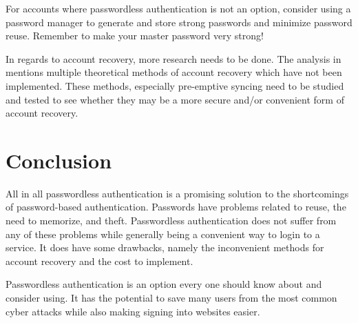\documentclass[12pt, letterpaper]{article}
\begin{document}
For accounts where passwordless authentication is not an option, consider using a password manager to generate and store strong passwords and minimize password reuse.
Remember to make your master password very strong!

In regards to account recovery, more research needs to be done.
The analysis in \parencite{kunke2021evaluation} mentions multiple theoretical methods of account recovery which have not been implemented.
These methods, especially pre-emptive syncing need to be studied and tested to see whether they may be a more secure and/or convenient form of account recovery.

\newpage
\section{Conclusion}
All in all passwordless authentication is a promising solution to the shortcomings of password-based authentication.
Passwords have problems related to reuse, the need to memorize, and theft.
Passwordless authentication does not suffer from any of these problems while generally being a convenient way to login to a service.
It does have some drawbacks, namely the inconvenient methods for account recovery and the cost to implement.

Passwordless authentication is an option every one should know about and consider using.
It has the potential to save many users from the most common cyber attacks while also making signing into websites easier.

\newpage
\printbibliography
\end{document}
